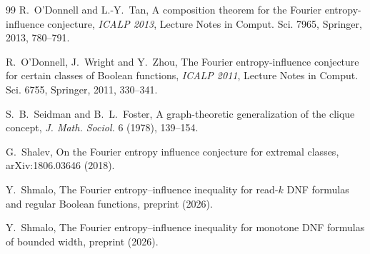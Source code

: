 \documentclass[11pt]{amsart}
\theoremstyle{remark}
\begin{document}
\begin{thebibliography}{99}
 R.~O'Donnell and L.-Y.~Tan, A composition theorem for the Fourier entropy-influence conjecture,
\emph{ICALP 2013}, Lecture Notes in Comput. Sci. 7965, Springer, 2013, 780--791.

 R.~O'Donnell, J.~Wright and Y.~Zhou, The Fourier entropy-influence conjecture for certain classes of
Boolean functions, \emph{ICALP 2011}, Lecture Notes in Comput. Sci. 6755, Springer, 2011, 330--341.

 S.~B.~Seidman and B.~L.~Foster, A graph-theoretic generalization of the clique concept, \emph{J.
Math. Sociol.} 6 (1978), 139--154.

 G.~Shalev, On the Fourier entropy influence conjecture for extremal classes, arXiv:1806.03646 (2018).

 Y.~Shmalo, The Fourier entropy--influence inequality for read-$k$ DNF formulas and regular Boolean
functions, preprint (2026).

 Y.~Shmalo, The Fourier entropy--influence inequality for monotone DNF formulas of bounded width,
preprint (2026).

\end{thebibliography}
\end{document}
